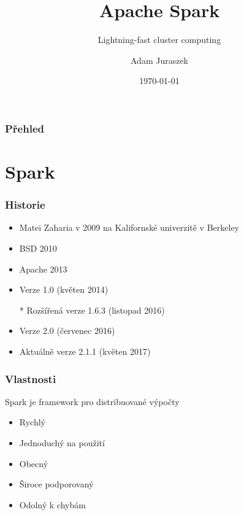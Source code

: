 \documentclass[xcolor=dvipsnames,compact]{beamer}
\title{Apache Spark}
\subtitle{Lightning-fast cluster computing}
\author{Adam Juraszek}
\institute{Ataccama Software, s.r.o.}
\date{\today}
\begin{document}
{
\begin{frame}[plain]
  \titlepage
\end{frame}
}

\begin{frame}
	\frametitle{Přehled} 
	\tableofcontents
\end{frame}

\section{Spark}

\begin{frame}
	\frametitle{Historie}
	\begin{itemize}
		\item Matei Zaharia v 2009 na Kalifornské univerzitě v Berkeley
		\item BSD 2010
		\item Apache 2013
		\item Verze 1.0 (květen 2014)
		\item[*] Rozšířená verze 1.6.3 (listopad 2016)
		\item Verze 2.0 (červenec 2016)
		\item Aktuálně verze 2.1.1 (květen 2017) 
	\end{itemize}
\end{frame}

\begin{frame}
	\frametitle{Vlastnosti}
	Spark je framework pro distribuované výpočty
	\begin{itemize}
		\item Rychlý
		\item Jednoduchý na použití
		\item Obecný
		\item Široce podporovaný 
		\item Odolný k chybám
	\end{itemize}
\end{frame}
\end{document}
